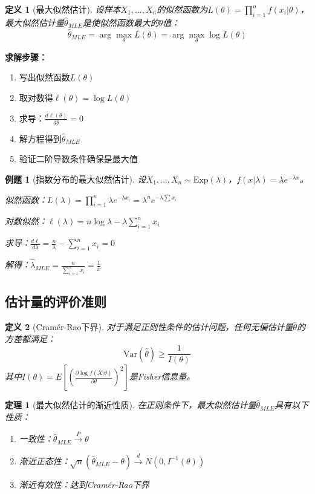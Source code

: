 \documentclass[12pt,a4paper]{article}
\newtheorem{theorem}{定理}[section]
\newtheorem{definition}{定义}[section]
\newtheorem{example}{例题}[section]
\theoremstyle{remark}
\begin{document}
\begin{definition}[最大似然估计]
设样本$X_1, \ldots, X_n$的似然函数为$L(\theta) = \prod_{i=1}^n f(x_i|\theta)$，最大似然估计量$\hat{\theta}_{MLE}$是使似然函数最大的$\theta$值：
$$\hat{\theta}_{MLE} = \arg\max_\theta L(\theta) = \arg\max_\theta \log L(\theta)$$
\end{definition}

\textbf{求解步骤：}
\begin{enumerate}
\item 写出似然函数$L(\theta)$
\item 取对数得$\ell(\theta) = \log L(\theta)$
\item 求导：$\frac{d\ell(\theta)}{d\theta} = 0$
\item 解方程得到$\hat{\theta}_{MLE}$
\item 验证二阶导数条件确保是最大值
\end{enumerate}

\begin{example}[指数分布的最大似然估计]
设$X_1, \ldots, X_n \sim \text{Exp}(\lambda)$，$f(x|\lambda) = \lambda e^{-\lambda x}$。

似然函数：$L(\lambda) = \prod_{i=1}^n \lambda e^{-\lambda x_i} = \lambda^n e^{-\lambda \sum x_i}$

对数似然：$\ell(\lambda) = n\log\lambda - \lambda\sum_{i=1}^n x_i$

求导：$\frac{d\ell}{d\lambda} = \frac{n}{\lambda} - \sum_{i=1}^n x_i = 0$

解得：$\hat{\lambda}_{MLE} = \frac{n}{\sum_{i=1}^n x_i} = \frac{1}{\bar{x}}$
\end{example}

\subsection{估计量的评价准则}

\begin{definition}[Cramér-Rao下界]
对于满足正则性条件的估计问题，任何无偏估计量$\hat{\theta}$的方差都满足：
$$\text{Var}(\hat{\theta}) \geq \frac{1}{I(\theta)}$$
其中$I(\theta) = E\left[\left(\frac{\partial \log f(X|\theta)}{\partial \theta}\right)^2\right]$是Fisher信息量。
\end{definition}

\begin{theorem}[最大似然估计的渐近性质]
在正则条件下，最大似然估计量$\hat{\theta}_{MLE}$具有以下性质：
\begin{enumerate}
\item 一致性：$\hat{\theta}_{MLE} \stackrel{P}{\to} \theta$
\item 渐近正态性：$\sqrt{n}(\hat{\theta}_{MLE} - \theta) \stackrel{d}{\to} N(0, I^{-1}(\theta))$
\item 渐近有效性：达到Cramér-Rao下界
\end{enumerate}
\end{theorem}
\end{document}
